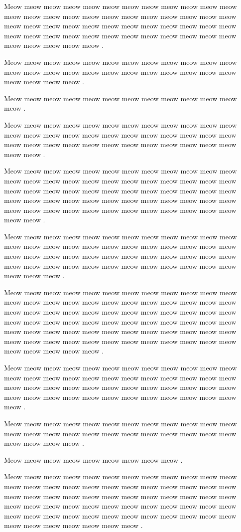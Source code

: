 \documentclass[12pt, a5paper, openany]{book}
\begin{document}
Meow meow meow meow meow meow meow meow meow meow meow meow meow meow meow meow meow meow meow meow meow meow meow meow meow meow meow meow meow meow meow meow meow meow meow meow meow meow meow meow meow meow meow meow meow meow meow meow meow meow meow meow meow .

Meow meow meow meow meow meow meow meow meow meow meow meow meow meow meow meow meow meow meow meow meow meow meow meow meow meow meow meow .

Meow meow meow meow meow meow meow meow meow meow meow meow meow .

Meow meow meow meow meow meow meow meow meow meow meow meow meow meow meow meow meow meow meow meow meow meow meow meow meow meow meow meow meow meow meow meow meow meow meow meow meow meow .

Meow meow meow meow meow meow meow meow meow meow meow meow meow meow meow meow meow meow meow meow meow meow meow meow meow meow meow meow meow meow meow meow meow meow meow meow meow meow meow meow meow meow meow meow meow meow meow meow meow meow meow meow meow meow meow meow meow meow meow meow meow meow .

Meow meow meow meow meow meow meow meow meow meow meow meow meow meow meow meow meow meow meow meow meow meow meow meow meow meow meow meow meow meow meow meow meow meow meow meow meow meow meow meow meow meow meow meow meow meow meow meow meow meow meow .

Meow meow meow meow meow meow meow meow meow meow meow meow meow meow meow meow meow meow meow meow meow meow meow meow meow meow meow meow meow meow meow meow meow meow meow meow meow meow meow meow meow meow meow meow meow meow meow meow meow meow meow meow meow meow meow meow meow meow meow meow meow meow meow meow meow meow meow meow meow meow meow meow meow meow meow meow meow .

Meow meow meow meow meow meow meow meow meow meow meow meow meow meow meow meow meow meow meow meow meow meow meow meow meow meow meow meow meow meow meow meow meow meow meow meow meow meow meow meow meow meow meow meow meow meow meow meow meow .

Meow meow meow meow meow meow meow meow meow meow meow meow meow meow meow meow meow meow meow meow meow meow meow meow meow meow meow meow .

Meow meow meow meow meow meow meow meow meow .

Meow meow meow meow meow meow meow meow meow meow meow meow meow meow meow meow meow meow meow meow meow meow meow meow meow meow meow meow meow meow meow meow meow meow meow meow meow meow meow meow meow meow meow meow meow meow meow meow meow meow meow meow meow meow meow meow meow meow meow meow meow meow meow meow meow meow meow .
\end{document}
